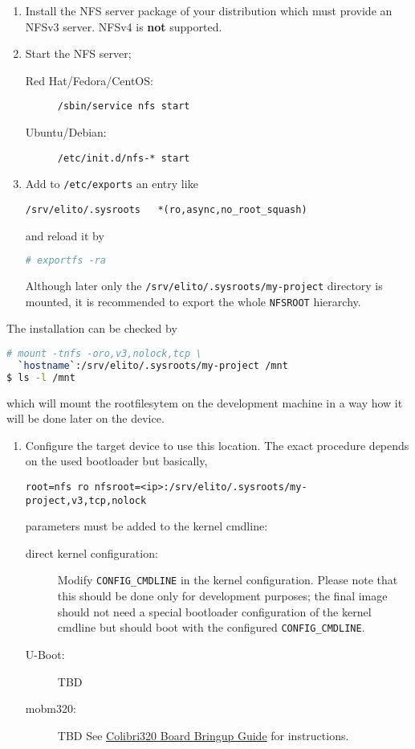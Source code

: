 \begin{enumerate}[resume]
\item Install the NFS server package of your distribution which must
  provide an NFSv3 server. NFSv4 is \textbf{not} supported.
\item Start the NFS server;

  \begin{description}
  \item[Red Hat/Fedora/CentOS:] \lstinline[language=sh]{/sbin/service nfs start}
  \item[Ubuntu/Debian:] \lstinline[language=sh]{/etc/init.d/nfs-* start}
  \end{description}
\item Add to \texttt{/etc/exports} an entry like
\begin{verbatim}
/srv/elito/.sysroots   *(ro,async,no_root_squash)
\end{verbatim} and reload it by
\begin{lstlisting}[language=sh]
# exportfs -ra
\end{lstlisting}

  Although later only the \texttt{/srv/elito/.sysroots/my-project}
  directory is mounted, it is recommended to export the whole
  \texttt{NFSROOT} hierarchy.

\end{enumerate}

The installation can be checked by
\begin{lstlisting}[language=sh]
# mount -tnfs -oro,v3,nolock,tcp \
  `hostname`:/srv/elito/.sysroots/my-project /mnt
$ ls -l /mnt
\end{lstlisting}%
  which will mount the rootfilesytem on the development machine in a
  way how it will be done later on the device.

  \begin{enumerate}[resume]
  \item Configure the target device to use this location.  The exact
    procedure depends on the used bootloader but basically,
\begin{verbatim}
root=nfs ro nfsroot=<ip>:/srv/elito/.sysroots/my-project,v3,tcp,nolock
\end{verbatim}
    parameters must be added to the kernel cmdline:

    \begin{description}
    \item[direct kernel configuration:] Modify
      \texttt{CONFIG\_CMDLINE} in the kernel configuration.  Please
      note that this should be done only for development purposes; the
      final image should not need a special bootloader configuration
      of the kernel cmdline but should boot with the configured
      \texttt{CONFIG\_CMDLINE}.
    \item[U-Boot:] TBD
    \item[mobm320:] TBD
      See \href{https://www.cvg.de/people/ensc/pxa320/BoardBringUp.html}{Colibri320 Board Bringup Guide} for instructions.
    \end{description}
  \end{enumerate}


